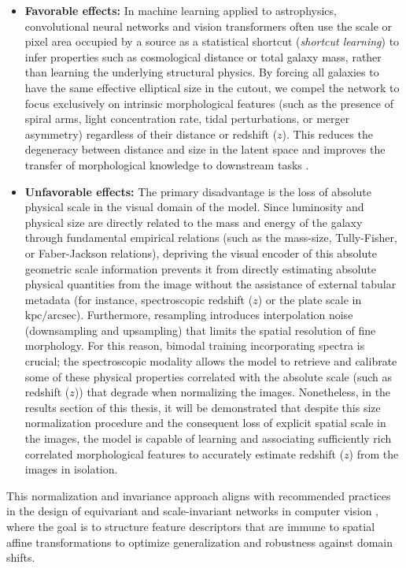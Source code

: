 \begin{itemize}
\item \textbf{Favorable effects:} In machine learning applied to astrophysics, convolutional neural networks and vision transformers often use the scale or pixel area occupied by a source as a statistical shortcut (\textit{shortcut learning}) to infer properties such as cosmological distance or total galaxy mass, rather than learning the underlying structural physics. By forcing all galaxies to have the same effective elliptical size in the cutout, we compel the network to focus exclusively on intrinsic morphological features (such as the presence of spiral arms, light concentration rate, tidal perturbations, or merger asymmetry) regardless of their distance or redshift ($z$). This reduces the degeneracy between distance and size in the latent space and improves the transfer of morphological knowledge to downstream tasks \autocite{ar:dieleman-2015}.
\item \textbf{Unfavorable effects:} The primary disadvantage is the loss of absolute physical scale in the visual domain of the model. Since luminosity and physical size are directly related to the mass and energy of the galaxy through fundamental empirical relations (such as the mass-size, Tully-Fisher, or Faber-Jackson relations), depriving the visual encoder of this absolute geometric scale information prevents it from directly estimating absolute physical quantities from the image without the assistance of external tabular metadata (for instance, spectroscopic redshift ($z$) or the plate scale in $\text{kpc}/\text{arcsec}$). Furthermore, resampling introduces interpolation noise (downsampling and upsampling) that limits the spatial resolution of fine morphology. For this reason, bimodal training incorporating spectra is crucial; the spectroscopic modality allows the model to retrieve and calibrate some of these physical properties correlated with the absolute scale (such as redshift ($z$)) that degrade when normalizing the images. Nonetheless, in the results section of this thesis, it will be demonstrated that despite this size normalization procedure and the consequent loss of explicit spatial scale in the images, the model is capable of learning and associating sufficiently rich correlated morphological features to accurately estimate redshift ($z$) from the images in isolation.
\end{itemize}

This normalization and invariance approach aligns with recommended practices in the design of equivariant and scale-invariant networks in computer vision \autocite{ar:weiler-2019}, where the goal is to structure feature descriptors that are immune to spatial affine transformations to optimize generalization and robustness against domain shifts.

